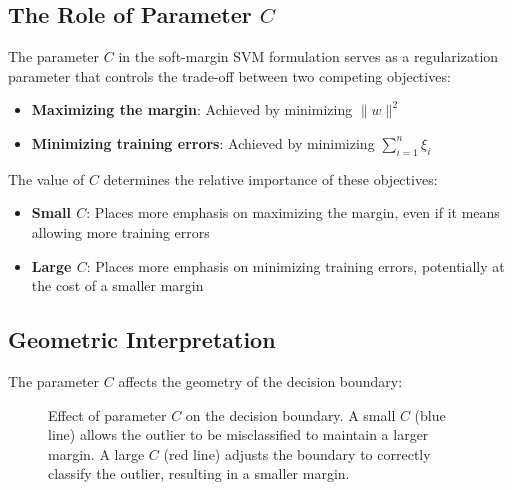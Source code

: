 \documentclass{article}
\begin{document}
\subsection{The Role of Parameter $C$}
The parameter $C$ in the soft-margin SVM formulation serves as a regularization parameter that controls the trade-off between two competing objectives:

\begin{itemize}
    \item \textbf{Maximizing the margin}: Achieved by minimizing $\|w\|^2$
    \item \textbf{Minimizing training errors}: Achieved by minimizing $\sum_{i=1}^{n}\xi_{i}$
\end{itemize}

The value of $C$ determines the relative importance of these objectives:

\begin{itemize}
    \item \textbf{Small $C$}: Places more emphasis on maximizing the margin, even if it means allowing more training errors
    \item \textbf{Large $C$}: Places more emphasis on minimizing training errors, potentially at the cost of a smaller margin
\end{itemize}

\subsection{Geometric Interpretation}
The parameter $C$ affects the geometry of the decision boundary:

\begin{figure}[h]
\centering
{}
\caption{Effect of parameter $C$ on the decision boundary. A small $C$ (blue line) allows the outlier to be misclassified to maintain a larger margin. A large $C$ (red line) adjusts the boundary to correctly classify the outlier, resulting in a smaller margin.}
\end{figure}
\end{document}
